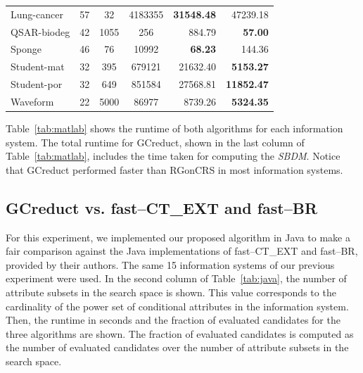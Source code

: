 \documentclass[number,preprint,review,12pt]{elsarticle}
\begin{document}
\begin{table}[!htb]
\begin{tabular}{|l|c|c|c|r|r|}
			Lung-cancer               & 57         & 32        & 4183355  & \textbf{31548.48} & 47239.18           \\
			QSAR-biodeg               & 42         & 1055      & 256      &  884.79           & \textbf{57.00}     \\
			Sponge                    & 46         & 76        & 10992    & \textbf{68.23}    & 144.36             \\
			Student-mat               & 32         & 395       & 679121   & 21632.40          & \textbf{5153.27}   \\
			Student-por               & 32         & 649       & 851584   & 27568.81          & \textbf{11852.47}  \\
			Waveform                  & 22         & 5000      & 86977    & 8739.26           & \textbf{5324.35}   \\				
			\hline
    	\end{tabular}
    \end{table}
    	
	Table~\ref{tab:matlab} shows the runtime of both algorithms for each information system. The total runtime for GCreduct, shown in the last column of Table~\ref{tab:matlab}, includes the time taken for computing the \textit{SBDM}. Notice that GCreduct performed faster than RGonCRS in most information systems.

\subsection{GCreduct vs. fast--CT\_EXT and fast--BR}\label{sub:java}
	
	For this experiment, we implemented our proposed algorithm in Java to make a fair comparison against the Java implementations of fast--CT\_EXT and fast--BR, provided by their authors. The same 15 information systems of our previous experiment were used. In the second column of Table~\ref{tab:java}, the number of attribute subsets in the search space is shown. This value corresponds to the cardinality of the power set of conditional attributes in the information system. Then, the runtime in seconds and the fraction of evaluated candidates for the three algorithms are shown. The fraction of evaluated candidates is computed as the number of evaluated candidates over the number of attribute subsets in the search space.
	
\end{document}

